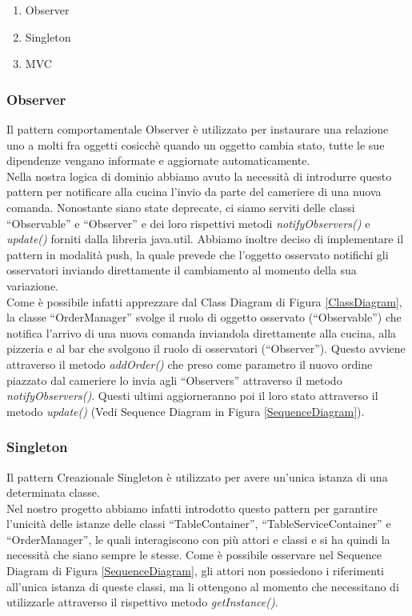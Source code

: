 \documentclass{article}
\begin{document}
\begin{enumerate}
\item Observer
\item Singleton
\item MVC
\end{enumerate}

\subsubsection{Observer}
\label{Observer}
Il pattern comportamentale Observer \`e utilizzato per instaurare una relazione uno a molti fra oggetti cosicch\`e quando un oggetto cambia stato, tutte le sue dipendenze vengano informate e aggiornate automaticamente.\\
Nella nostra logica di dominio abbiamo avuto la necessit\`a di introdurre questo pattern per notificare alla cucina l'invio da parte del cameriere di una nuova comanda. Nonostante siano state deprecate, ci siamo serviti delle classi ``Observable'' e ``Observer'' e dei loro rispettivi metodi \textit{notifyObservers()} e \textit{update()} forniti dalla libreria java.util. Abbiamo inoltre deciso di implementare il pattern in modalit\`a push, la quale prevede che l'oggetto osservato notifichi gli osservatori inviando direttamente il cambiamento al momento della sua variazione. \\ Come \`e possibile infatti apprezzare dal Class Diagram di Figura \ref{ClassDiagram}, la classe ``OrderManager'' svolge il ruolo di oggetto osservato (``Observable'') che notifica l'arrivo di una nuova comanda inviandola direttamente alla cucina, alla pizzeria e al bar che svolgono il ruolo di osservatori (``Observer''). Questo avviene attraverso il metodo \textit{addOrder()} che preso come parametro il nuovo ordine piazzato dal cameriere lo invia agli ``Observers'' attraverso il metodo \textit{notifyObservers()}. Questi ultimi aggiorneranno poi il loro stato attraverso il metodo \textit{update()} (Vedi Sequence Diagram in Figura \ref{SequenceDiagram}).

\newpage

\subsubsection{Singleton}

Il pattern Creazionale Singleton \`e utilizzato per avere un'unica istanza di una determinata classe. \\
Nel nostro progetto abbiamo infatti introdotto questo pattern per garantire l'unicit\`a delle istanze delle classi ``TableContainer'', ``TableServiceContainer'' e ``OrderManager'', le quali interagiscono con pi\`u attori e classi e si ha quindi la necessit\`a che siano sempre le stesse. Come \`e possibile osservare nel Sequence Diagram di Figura \ref{SequenceDiagram}, gli attori non possiedono i riferimenti all'unica istanza di queste classi, ma li ottengono al momento che necessitano di utilizzarle attraverso il rispettivo metodo \textit{getInstance()}.
\end{document}
